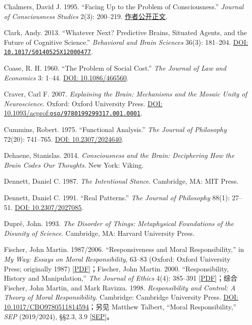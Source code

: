 \documentclass[
  11pt,
  oneside]{book}
\begin{document}
Chalmers, David J. 1995. ``Facing Up to the Problem of Consciousness.'' \emph{Journal of Consciousness Studies} 2(3): 200--219. \href{https://consc.net/papers/facing.html}{作者公开正文}.

Clark, Andy. 2013. ``Whatever Next? Predictive Brains, Situated Agents, and the Future of Cognitive Science.'' \emph{Behavioral and Brain Sciences} 36(3): 181--204. \href{https://doi.org/10.1017/S0140525X12000477}{DOI: \nolinkurl{10.1017/S0140525X12000477}}.

Coase, R. H. 1960. ``The Problem of Social Cost.'' \emph{The Journal of Law and Economics} 3: 1--44. \href{https://doi.org/10.1086/466560}{DOI: 10.1086/466560}.

Craver, Carl F. 2007. \emph{Explaining the Brain: Mechanisms and the Mosaic Unity of Neuroscience}. Oxford: Oxford University Press. \href{https://doi.org/10.1093/acprof:oso/9780199299317.001.0001}{DOI: 10.1093/acprof:\nolinkurl{oso/9780199299317.001.0001}}.

Cummins, Robert. 1975. ``Functional Analysis.'' \emph{The Journal of Philosophy} 72(20): 741--765. \href{https://doi.org/10.2307/2024640}{DOI: 10.2307/2024640}.

Dehaene, Stanislas. 2014. \emph{Consciousness and the Brain: Deciphering How the Brain Codes Our Thoughts}. New York: Viking.

Dennett, Daniel C. 1987. \emph{The Intentional Stance}. Cambridge, MA: MIT Press.

Dennett, Daniel C. 1991. ``Real Patterns.'' \emph{The Journal of Philosophy} 88(1): 27--51. \href{https://doi.org/10.2307/2027085}{DOI: 10.2307/2027085}.

Dupré, John. 1993. \emph{The Disorder of Things: Metaphysical Foundations of the Disunity of Science}. Cambridge, MA: Harvard University Press.

Fischer, John Martin. 1987/2006. ``Responsiveness and Moral Responsibility,'' in \emph{My Way: Essays on Moral Responsibility}, 63--83 (Oxford: Oxford University Press; originally 1987) {[}\href{https://andrewmbailey.com/jmf/Responsiveness_Responsibility.pdf}{PDF}{]}；Fischer, John Martin. 2000. ``Responsibility, History and Manipulation,'' \emph{The Journal of Ethics} 4(4): 385--391 {[}\href{https://andrewmbailey.com/jmf/Responsibility_History_Manipulation.pdf}{PDF}{]}；综合 Fischer, John Martin, and Mark Ravizza. 1998. \emph{Responsibility and Control: A Theory of Moral Responsibility}. Cambridge: Cambridge University Press. \href{https://doi.org/10.1017/CBO9780511814594}{DOI: 10.1017/CBO9780511814594}；另见 Matthew Talbert, ``Moral Responsibility,'' \emph{SEP} (2019/2024), §§2.3, 3.9 {[}\href{https://plato.stanford.edu/entries/moral-responsibility/}{SEP}{]}。
\end{document}
